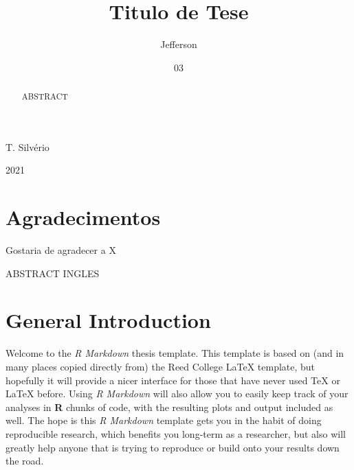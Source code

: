 \documentclass[msc,numbers,hidelinks]{coppe}
\begin{document}
  \title{Titulo de Tese}
    \author{Jefferson}{T. Silvério}
  

  \date{03}{2021}
    
  \maketitle

  \frontmatter
  
  \dedication{A alguém cujo valor é digno desta dedicatória.}
    \chapter*{Agradecimentos}
  Gostaria de agradecer a X
  
  \begin{abstract}
  ABSTRACT
  \end{abstract}
  \pagebreak
  \begin{foreignabstract}
  ABSTRACT INGLES
  \end{foreignabstract}
  \tableofcontents
  
    \listoffigures
  
    \listoftables
  
  \printlosymbols
  \printloabbreviations

  \mainmatter
  \hypertarget{general-introduction}{%
  \chapter*{General Introduction}\label{general-introduction}}

  Welcome to the \emph{R Markdown} thesis template. This template is based on (and in many places copied directly from) the Reed College LaTeX template, but hopefully it will provide a nicer interface for those that have never used TeX or LaTeX before. Using \emph{R Markdown} will also allow you to easily keep track of your analyses in \textbf{R} chunks of code, with the resulting plots and output included as well. The hope is this \emph{R Markdown} template gets you in the habit of doing reproducible research, which benefits you long-term as a researcher, but also will greatly help anyone that is trying to reproduce or build onto your results down the road.
\end{document}
